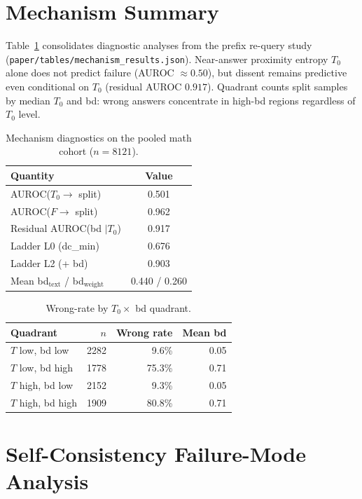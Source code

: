 \documentclass{article} %
\begin{document}
\section{Mechanism Summary}
\label{app:mechanism}

Table~\ref{tab:app-mechanism} consolidates diagnostic analyses from the prefix re-query study (\texttt{paper/tables/mechanism\_results.json}).
Near-answer proximity entropy $T_0$ alone does not predict failure (AUROC $\approx 0.50$), but dissent remains predictive even conditional on $T_0$ (residual AUROC $0.917$).
Quadrant counts split samples by median $T_0$ and bd: wrong answers concentrate in high-bd regions regardless of $T_0$ level.

\begin{table}[t]
  \centering
  \small
  \caption{Mechanism diagnostics on the pooled math cohort ($n{=}8121$).}
  \label{tab:app-mechanism}
  \begin{tabular}{lc}
    \toprule
    Quantity & Value \\
    \midrule
    AUROC($T_0 \rightarrow$ split) & 0.501 \\
    AUROC($F \rightarrow$ split) & 0.962 \\
    Residual AUROC(bd $\mid T_0$) & 0.917 \\
    Ladder L0 (dc\_min) & 0.676 \\
    Ladder L2 (+ bd) & 0.903 \\
    Mean bd$_{\text{text}}$ / bd$_{\text{weight}}$ & 0.440 / 0.260 \\
    \bottomrule
  \end{tabular}
\end{table}

\begin{table}[t]
  \centering
  \small
  \caption{Wrong-rate by $T_0 \times$ bd quadrant.}
  \label{tab:app-quadrants}
  \begin{tabular}{lrrr}
    \toprule
    Quadrant & $n$ & Wrong rate & Mean bd \\
    \midrule
    $T$ low, bd low  & 2282 & 9.6\%  & 0.05 \\
    $T$ low, bd high & 1778 & 75.3\% & 0.71 \\
    $T$ high, bd low & 2152 & 9.3\%  & 0.05 \\
    $T$ high, bd high & 1909 & 80.8\% & 0.71 \\
    \bottomrule
  \end{tabular}
\end{table}


\section{Self-Consistency Failure-Mode Analysis}
\label{app:sc-failure}
\end{document}
